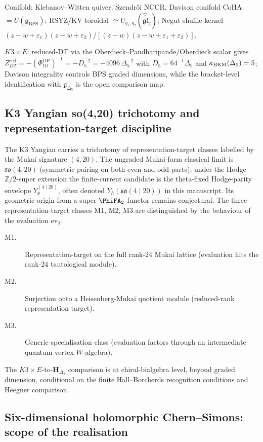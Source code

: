 Conifold: Klebanov--Witten quiver, Szendr\H{o}i NCCR, Davison
conifold CoHA $= U(\mathfrak g_{\mathrm{BPS}})$; RSYZ/KV toroidal
$\simeq U_{q_1,q_2}(\hat{\hat{\mathfrak{gl}}}_2)$; Negut shuffle
kernel $(z-w+\varepsilon_1)(z-w+\varepsilon_2)/[(z-w)(z-w+\varepsilon_1+\varepsilon_2)]$.

$K3\times E$: reduced-DT via the Oberdieck--Pandharipande/Oberdieck
scalar gives
$Z^{\mathrm{red}}_{DT}=-(\Phi_{10}^{\mathrm{OP}})^{-1}=-D_5^{-2}
=-4096\,\Delta_5^{-2}$ with
$D_5=64^{-1}\Delta_5$ and $\kappa_{\mathrm{BKM}}(\Delta_5) = 5$; Davison integrality
controls BPS graded dimensions, while the bracket-level identification
with $\mathfrak g_{\Delta_5}$ is the open comparison map.

\subsection{K3 Yangian so(4,20) trichotomy and representation-target discipline}
\label{subsec:v3-intro-k3-yangian-trichotomy}

The K3 Yangian carries a trichotomy of representation-target classes
labelled by the Mukai signature $(4, 20)$. The ungraded Mukai-form
classical limit is $\mathfrak{so}(4, 20)$ (symmetric pairing on both
even and odd parts); under the Hodge $\mathbb{Z}/2$-super extension
the finite-current candidate is the theta-fixed Hodge-parity envelope
\(Y_\theta^{(4\mid20)}\), often denoted
\(Y_\hbar(\mathfrak{so}(4 \mid 20))\) in this manuscript. Its geometric
origin from a super-\(\PhiFA_2\) functor remains conjectural. The three
representation-target classes M1, M2, M3 are distinguished by the
behaviour of the evaluation
$\mathrm{ev}_\lambda$:
\begin{description}
\item[M1.] Representation-target on the full rank-$24$ Mukai lattice
(evaluation hits the rank-$24$ tautological module).
\item[M2.] Surjection onto a Heisenberg-Mukai quotient module
(reduced-rank representation target).
\item[M3.] Generic-specialisation class
(evaluation factors through an intermediate quantum vertex
$W$-algebra).
\end{description}
The $K3 \times E$-to-$\mathbf{H}_{\Delta_5}$ comparison is at
chiral-bialgebra level, beyond graded dimension, conditional on the
finite Hall--Borcherds recognition conditions and Heegner comparison.

\subsection{Six-dimensional holomorphic Chern--Simons: scope of the realisation}
\label{subsec:v3-intro-6d-hCS-scope}

